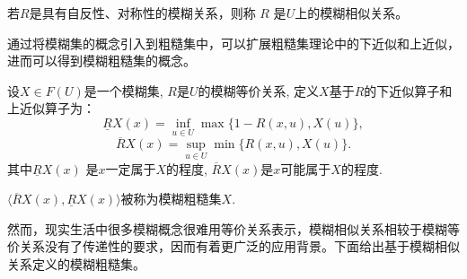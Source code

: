 若$R$是具有自反性、对称性的模糊关系，则称 $R$ 是$U$上的模糊相似关系。

通过将模糊集的概念引入到粗糙集中，可以扩展粗糙集理论中的下近似和上近似，进而可以得到模糊粗糙集的概念。
\begin{Definition}[广义模糊粗糙集]\cite{dong2023incremental}
    设$X\in F(U)$是一个模糊集, $R$是$U$的模糊等价关系, 定义$X$基于$R$的下近似算子和上近似算子为：
$$\underline{R} X(x)=\inf _{u \in U} \max \{1-R(x, u), X(u)\},$$
$$ \overline{R} X(x)=\sup _{u \in U} \min \{R(x, u), X(u)\} .$$
其中$\underline{R}X(x)$ 是$x$一定属于$X$的程度, $\overline{R}X(x)$是$x$可能属于$X$的程度.  

$\langle\overline{R} X(x), \underline{R}X(x)\rangle$被称为模糊粗糙集$X$.
\end{Definition}
然而，现实生活中很多模糊概念很难用等价关系表示，模糊相似关系相较于模糊等价关系没有了传递性的要求，因而有着更广泛的应用背景。下面给出基于模糊相似关系定义的模糊粗糙集。

